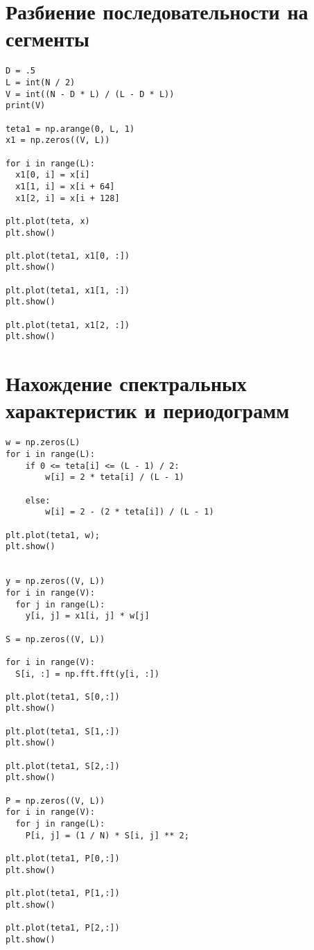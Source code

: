 \documentclass[12pt]{article}
\begin{document}
\section{Разбиение последовательности на сегменты}




\begin{lstlisting}
D = .5
L = int(N / 2)
V = int((N - D * L) / (L - D * L))
print(V)

teta1 = np.arange(0, L, 1)
x1 = np.zeros((V, L))

for i in range(L):
  x1[0, i] = x[i]
  x1[1, i] = x[i + 64]
  x1[2, i] = x[i + 128]

plt.plot(teta, x)
plt.show()

plt.plot(teta1, x1[0, :])
plt.show()

plt.plot(teta1, x1[1, :])
plt.show()

plt.plot(teta1, x1[2, :])
plt.show()
\end{lstlisting}


\section{ Нахождение спектральных характеристик и периодограмм}

\begin{lstlisting}
w = np.zeros(L)
for i in range(L):
    if 0 <= teta[i] <= (L - 1) / 2:
        w[i] = 2 * teta[i] / (L - 1)

    else:
        w[i] = 2 - (2 * teta[i]) / (L - 1)

plt.plot(teta1, w);
plt.show()


y = np.zeros((V, L))
for i in range(V):
  for j in range(L):
    y[i, j] = x1[i, j] * w[j]

S = np.zeros((V, L))

for i in range(V):
  S[i, :] = np.fft.fft(y[i, :])

plt.plot(teta1, S[0,:])
plt.show()

plt.plot(teta1, S[1,:])
plt.show()

plt.plot(teta1, S[2,:])
plt.show()

P = np.zeros((V, L))
for i in range(V):
  for j in range(L):
    P[i, j] = (1 / N) * S[i, j] ** 2;

plt.plot(teta1, P[0,:])
plt.show()

plt.plot(teta1, P[1,:])
plt.show()

plt.plot(teta1, P[2,:])
plt.show()
\end{lstlisting}
\end{document}
